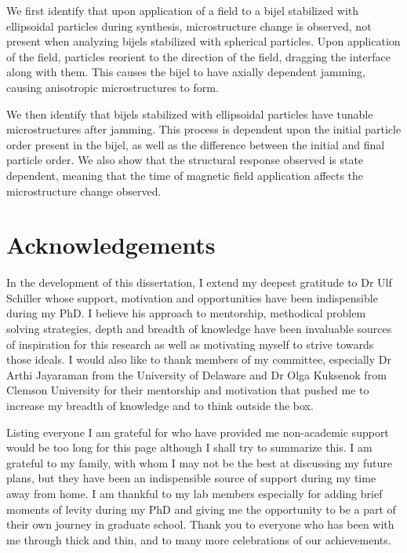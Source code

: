 \documentclass[12pt]{book}
\begin{document}
We first identify that upon application of a field to a bijel stabilized with ellipsoidal particles during synthesis, 
microstructure change is observed, not present when analyzing bijels stabilized with spherical particles. Upon 
application of the field, particles reorient to the direction of the field, dragging the interface along with 
them. This causes the bijel to have axially dependent jamming, causing anisotropic microstructures to form.

We then identify that bijels stabilized with ellipsoidal particles have tunable microstructures after jamming. 
This process is dependent upon the initial particle order present in the bijel, as well as the difference 
between the initial and final particle order. We also show that the structural response observed is state 
dependent, meaning that the time of magnetic field application affects the microstructure change observed.

\newpage

\section*{Acknowledgements}

In the development of this dissertation, I extend my deepest gratitude to Dr Ulf Schiller whose support, motivation and 
opportunities have been indispensible during my PhD. I believe his approach to mentorship, methodical problem solving 
strategies, depth and breadth of knowledge have been invaluable sources of inspiration for this research as well as 
motivating myself to strive towards those ideals. I would also like to thank members of my committee, especially 
Dr Arthi Jayaraman from the University of Delaware and Dr Olga Kuksenok from Clemson University for their mentorship 
and motivation that pushed me to increase my breadth of knowledge and to think outside the box.

Listing everyone I am grateful for who have provided me non-academic support would be too long for this page 
although I shall try to summarize this. I am grateful to my family, with whom I may not be the best at 
discussing my future plans, but they have been an indispensible source of support during my time away from home. 
I am thankful to my lab members especially for adding brief moments of levity during my PhD and giving me the 
opportunity to be a part of their own journey in graduate school. Thank you to everyone who has been with me 
through thick and thin, and to many more celebrations of our achievements. 
\end{document}
